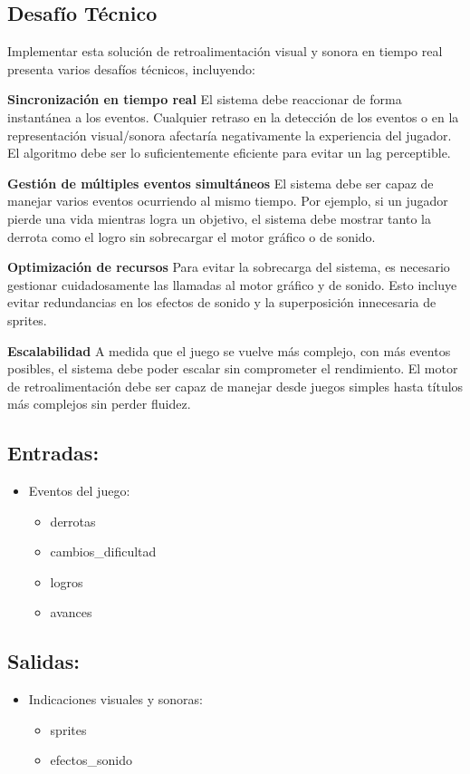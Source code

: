 \subsection*{Desafío Técnico}
Implementar esta solución de retroalimentación visual y sonora en tiempo real presenta varios desafíos técnicos, incluyendo:

\textbf{Sincronización en tiempo real}
El sistema debe reaccionar de forma instantánea a los eventos. Cualquier retraso en la detección de los eventos o en la representación visual/sonora afectaría negativamente la experiencia del jugador. El algoritmo debe ser lo suficientemente eficiente para evitar un lag perceptible.

\textbf{Gestión de múltiples eventos simultáneos}
El sistema debe ser capaz de manejar varios eventos ocurriendo al mismo tiempo. Por ejemplo, si un jugador pierde una vida mientras logra un objetivo, el sistema debe mostrar tanto la derrota como el logro sin sobrecargar el motor gráfico o de sonido.

\textbf{Optimización de recursos}
Para evitar la sobrecarga del sistema, es necesario gestionar cuidadosamente las llamadas al motor gráfico y de sonido. Esto incluye evitar redundancias en los efectos de sonido y la superposición innecesaria de sprites.

\textbf{Escalabilidad}
A medida que el juego se vuelve más complejo, con más eventos posibles, el sistema debe poder escalar sin comprometer el rendimiento. El motor de retroalimentación debe ser capaz de manejar desde juegos simples hasta títulos más complejos sin perder fluidez.


\subsection*{Entradas:}
\begin{itemize}
    \item Eventos del juego:
    \begin{itemize}
        \item derrotas
        \item cambios\_dificultad
        \item logros
        \item avances
    \end{itemize}
\end{itemize}

\subsection*{Salidas:}
\begin{itemize}
    \item Indicaciones visuales y sonoras:
    \begin{itemize}
        \item sprites
        \item efectos\_sonido
    \end{itemize}
\end{itemize}

